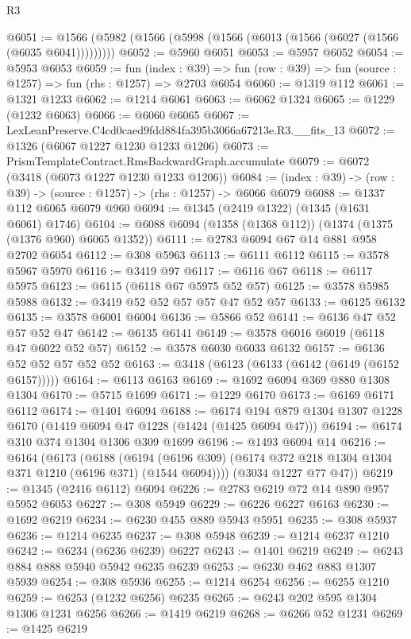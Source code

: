 \begin{lexlean}{R3}
\begin{coremodule}
@6051 := @1566 (@5982 (@1566 (@5998 (@1566 (@6013 (@1566 (@6027 (@1566 (@6035 @6041)))))))))
@6052 := @5960 @6051
@6053 := @5957 @6052
@6054 := @5953 @6053
@6059 := fun (index : @39) =>
  fun (row : @39) => fun (source : @1257) => fun (rhs : @1257) => @2703 @6054
@6060 := @1319 @112
@6061 := @1321 @1233
@6062 := @1214 @6061
@6063 := @6062 @1324
@6065 := @1229 (@1232 @6063)
@6066 := @6060 @6065
@6067 := LexLeanPreserve.C4cd0caed9fdd884fa395b3066a67213e.R3.__fits_13
@6072 := @1326 (@6067 @1227 @1230 @1233 @1206)
@6073 := PrismTemplateContract.RmsBackwardGraph.accumulate
@6079 := @6072 (@3418 (@6073 @1227 @1230 @1233 @1206))
@6084 := (index : @39) -> (row : @39) -> (source : @1257) -> (rhs : @1257) -> @6066 @6079
@6088 := @1337 @112 @6065 @6079 @960
@6094 := @1345 (@2419 @1322) (@1345 (@1631 @6061) @1746)
@6104 := @6088 @6094 (@1358 (@1368 @112)) (@1374 (@1375 (@1376 @960) @6065 @1352))
@6111 := @2783 @6094 @67 @14 @881 @958 @2702 @6054
@6112 := @308 @5963
@6113 := @6111 @6112
@6115 := @3578 @5967 @5970
@6116 := @3419 @97
@6117 := @6116 @67
@6118 := @6117 @5975
@6123 := @6115 (@6118 @67 @5975 @52 @57)
@6125 := @3578 @5985 @5988
@6132 := @3419 @52 @52 @57 @57 @47 @52 @57
@6133 := @6125 @6132
@6135 := @3578 @6001 @6004
@6136 := @5866 @52
@6141 := @6136 @47 @52 @57 @52 @47
@6142 := @6135 @6141
@6149 := @3578 @6016 @6019 (@6118 @47 @6022 @52 @57)
@6152 := @3578 @6030 @6033 @6132
@6157 := @6136 @52 @52 @57 @52 @52
@6163 := @3418 (@6123 (@6133 (@6142 (@6149 (@6152 @6157)))))
@6164 := @6113 @6163
@6169 := @1692 @6094 @369 @880 @1308 @1304
@6170 := @5715 @1699
@6171 := @1229 @6170
@6173 := @6169 @6171 @6112
@6174 := @1401 @6094
@6188 := @6174 @194 @879 @1304 @1307 @1228 @6170 (@1419 @6094 @47 @1228 (@1424 (@1425 @6094 @47)))
@6194 := @6174 @310 @374 @1304 @1306 @309 @1699
@6196 := @1493 @6094 @14
@6216 := @6164
    (@6173
      (@6188
        (@6194 (@6196 @309) (@6174 @372 @218 @1304 @1304 @371 @1210 (@6196 @371) (@1544 @6094))))
      (@3034 @1227 @77 @47))
@6219 := @1345 (@2416 @6112) @6094
@6226 := @2783 @6219 @72 @14 @890 @957 @5952 @6053
@6227 := @308 @5949
@6229 := @6226 @6227 @6163
@6230 := @1692 @6219
@6234 := @6230 @455 @889 @5943 @5951
@6235 := @308 @5937
@6236 := @1214 @6235
@6237 := @308 @5948
@6239 := @1214 @6237 @1210
@6242 := @6234 (@6236 @6239) @6227
@6243 := @1401 @6219
@6249 := @6243 @884 @888 @5940 @5942 @6235 @6239
@6253 := @6230 @462 @883 @1307 @5939
@6254 := @308 @5936
@6255 := @1214 @6254
@6256 := @6255 @1210
@6259 := @6253 (@1232 @6256) @6235
@6265 := @6243 @202 @595 @1304 @1306 @1231 @6256
@6266 := @1419 @6219
@6268 := @6266 @52 @1231
@6269 := @1425 @6219

\end{coremodule}
\end{lexlean}
